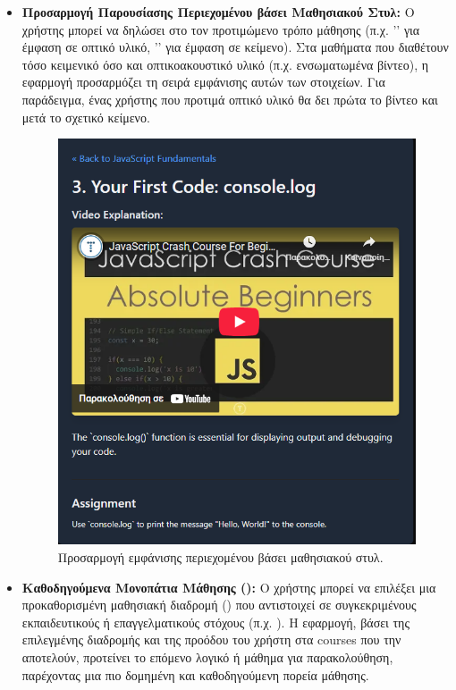 \begin{itemize}[leftmargin=*, noitemsep]
    \item \textbf{Προσαρμογή Παρουσίασης Περιεχομένου βάσει Μαθησιακού Στυλ:} Ο χρήστης μπορεί να δηλώσει στο  τον προτιμώμενο τρόπο μάθησης (π.χ. '' για έμφαση σε οπτικό υλικό, '' για έμφαση σε κείμενο). Στα μαθήματα που διαθέτουν τόσο κειμενικό όσο και οπτικοακουστικό υλικό (π.χ. ενσωματωμένα βίντεο), η εφαρμογή προσαρμόζει τη σειρά εμφάνισης αυτών των στοιχείων. Για παράδειγμα, ένας χρήστης που προτιμά οπτικό υλικό θα δει πρώτα το βίντεο και μετά το σχετικό κείμενο.
        \begin{figure}[h!]
          \centering
          \includegraphics[scale=0.5]{images/visual_learner_lesson.png}
          \caption{Προσαρμογή εμφάνισης περιεχομένου βάσει μαθησιακού στυλ.}
          \label{fig:lesson_visual_placeholder}
        \end{figure}
    \item \textbf{Καθοδηγούμενα Μονοπάτια Μάθησης ():} Ο χρήστης μπορεί να επιλέξει μια προκαθορισμένη μαθησιακή διαδρομή () που αντιστοιχεί σε συγκεκριμένους εκπαιδευτικούς ή επαγγελματικούς στόχους (π.χ. ). Η εφαρμογή, βάσει της επιλεγμένης διαδρομής και της προόδου του χρήστη στα courses που την αποτελούν, προτείνει το επόμενο λογικό  ή μάθημα για παρακολούθηση, παρέχοντας μια πιο δομημένη και καθοδηγούμενη πορεία μάθησης.

\end{itemize}
